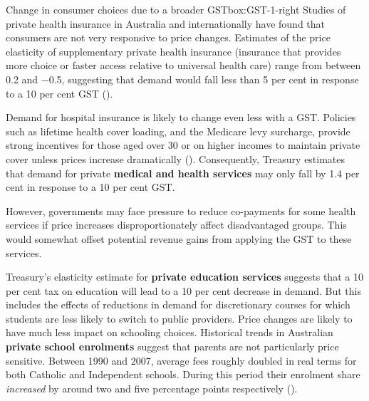 {\begin{rultrabox}{Change in consumer choices due to a broader GST}{box:GST-1-right}
Studies of private health insurance in Australia and internationally have found that consumers are not very responsive to price changes. Estimates of the price elasticity of supplementary private health insurance (insurance that provides more choice or faster access relative to universal health care) range from between 0.2 and $-$0.5, suggesting that demand would fall less than 5 per cent in response to a 10 per cent GST (\textcite{Cheng2013-health-insurance-elasticity}). 

Demand for hospital insurance is likely to change even less with a GST. Policies such as lifetime health cover loading, and the Medicare levy surcharge, provide strong incentives for those aged over 30 or on higher incomes to maintain private cover unless prices increase dramatically (\textcite{ATO2015-Private-Health-Insurance-rebate-Medicare-levy-surcharge}). 
Consequently, Treasury estimates that demand for private \textbf{medical and health services} may only fall by 1.4 per cent in response to a 10 per cent GST. 

However, governments may face pressure to reduce co-payments for some health services if price increases disproportionately affect disadvantaged groups. This would somewhat offset potential revenue gains from applying the GST to these services. 

Treasury’s elasticity estimate for \textbf{private education services} suggests that a 10 per cent tax on education will lead to a 10 per cent decrease in demand. But this includes the effects of reductions in demand for discretionary courses for which students are less likely to switch to public providers. Price changes are likely to have much less impact on schooling choices. Historical trends in Australian \textbf{private school enrolments} suggest that parents are not particularly price sensitive. Between 1990 and 2007, average fees roughly doubled in real terms for both Catholic and Independent schools. During this period their enrolment share \emph{increased} by around two and five percentage points respectively (\textcite{NousGroup2011-Funding-for-Schooling}). 
\end{rultrabox}%
}



